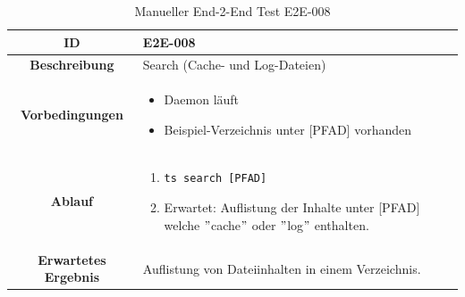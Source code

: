 \documentclass[a4paper,12pt]{report}
\begin{document}
    \begin{table}[h!]
        \centering
        \setlength{\leftmargini}{0.8cm}
        \begin{tabular}{|c|p{10cm}|}
            \hline
            \textbf{ID}                  & E2E-008                                            \\ \hline
            \textbf{Beschreibung}        & Search (Cache- und Log-Dateien)                    \\ \hline
            \textbf{Vorbedingungen} &
            \begin{itemize}
                \item Daemon läuft
                \item Beispiel-Verzeichnis unter [PFAD] vorhanden
            \end{itemize} \\ \hline
            \textbf{Ablauf} &
            \begin{enumerate}
                \item \begin{verbatim}ts search [PFAD]
                \end{verbatim}
                \item Erwartet: Auflistung der Inhalte unter [PFAD] welche \("\)cache\("\) oder \("\)log\("\) enthalten.
            \end{enumerate} \\ \hline
            \textbf{Erwartetes Ergebnis} & Auflistung von Dateiinhalten in einem Verzeichnis. \\ \hline
        \end{tabular}
        \caption{Manueller End-2-End Test E2E-008}\label{tab:e2e-8}
    \end{table}
\end{document}
